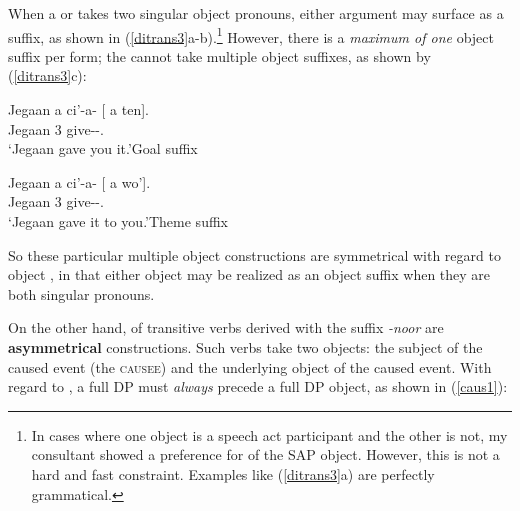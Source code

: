\documentclass[output=paper,
modfonts
]{langscibook}
\begin{document}
\noindent When a  or   takes two singular object pronouns, either argument may surface as a suffix, as shown in (\ref{ditrans3}{a-b}).\footnote{In cases where one object is a speech act participant and the other is not, my consultant showed a preference for  of the SAP object. However, this is not a hard and fast constraint. Examples like (\ref{ditrans3}{a}) are perfectly grammatical.} However, there is a \textit{maximum of one} object suffix per  form; the  cannot take multiple object suffixes, as shown by (\ref{ditrans3}c):

\begin{exe}
\ex \label{ditrans3}
\begin{xlista}

\ex \gll Jegaan a ci'-a- [ a ten].\\
Jegaan 3 give-\Dv{}-\Ssg{}.\Obj{} {} \Obj{} \Tsg{}  \\
\glt `Jegaan gave you it.'\hfill {Goal suffix}

\ex \gll Jegaan a ci'-a- [ a wo'].\\
Jegaan 3 give-\Dv{}-\Tsg{}.\Obj{} {} \Obj{} \Ssg{}  \\
\glt `Jegaan gave it to you.'\hfill {Theme suffix}


\end{xlista}
\end{exe}

\noindent So these particular multiple object constructions are symmetrical with regard to object , in that either object may be realized as an object suffix when they are both singular pronouns.

On the other hand,  of transitive verbs derived with the suffix \textit{-noor} are \textbf{asymmetrical}  constructions. Such verbs take two objects: the subject of the caused event (the \textsc{causee}) and the underlying object of the caused event. With regard to , a full DP  must \textit{always} precede a full DP object, as shown in (\ref{caus1}):
\end{document}
